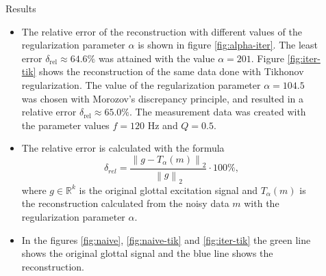 \documentclass[final]{beamer}
\newcommand{\R}{{\mathbb R}}
\begin{document}
\begin{frame}[t]
\begin{columns}[t]
\begin{column}{.465\textwidth}
\begin{block}{Results}
\begin{itemize}
\item The relative error of the reconstruction with different values of the regularization parameter $\alpha$ is shown in figure \ref{fig:alpha-iter}. The least error $\delta_{\text{rel}} \approx 64.6 \%$ was attained with the value $\alpha = 201$. Figure \ref{fig:iter-tik} shows the reconstruction of the same data done with Tikhonov regularization. The value of the regularization parameter $\alpha = 104.5$ was chosen with Morozov's discrepancy principle, and resulted in a relative error $\delta_{\text{rel}} \approx 65.0 \%$. The measurement data was created with the parameter values $f = 120 \text{ Hz}$ and $Q = 0.5$.

\item The relative error is calculated with the formula
\begin{equation}
\label{eq:relerr}
\delta_{rel} = \frac{\left\| g - T_{\alpha}(m) \right\|_2}{\left\| g \right\|_2} \cdot 100 \%,
\end{equation}
where $g \in \R^k$ is the original glottal excitation signal and $T_{\alpha}(m)$ is the reconstruction calculated from the noisy data $m$ with the regularization parameter $\alpha$.

\item In the figures \ref{fig:naive}, \ref{fig:naive-tik} and \ref{fig:iter-tik} the green line shows the original glottal signal and the blue line shows the reconstruction.

\end{itemize}

\end{block}




\end{column} %

\begin{column}{.03\textwidth}\end{column} %


\begin{column}{.465\textwidth} %





\end{column}
\end{columns}
\end{frame}
\end{document}
